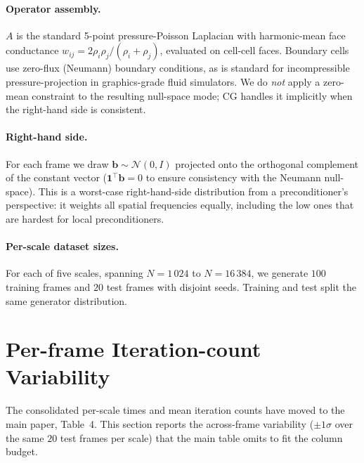 \documentclass[acmtog]{acmart}
\begin{document}
\paragraph{Operator assembly.}
$A$ is the standard 5-point pressure-Poisson Laplacian with harmonic-mean face
conductance $w_{ij}\!=\!2\rho_i\rho_j/(\rho_i\!+\!\rho_j)$, evaluated on
cell-cell faces. Boundary cells use zero-flux (Neumann) boundary conditions, as
is standard for incompressible pressure-projection in graphics-grade fluid
simulators. We do \emph{not} apply a zero-mean constraint to the resulting
null-space mode; CG handles it implicitly when the right-hand side is consistent.

\paragraph{Right-hand side.}
For each frame we draw $\mathbf{b}\!\sim\!\mathcal{N}(0, I)$ projected onto the
orthogonal complement of the constant vector ($\mathbf{1}^\top\mathbf{b}\!=\!0$
to ensure consistency with the Neumann null-space). This is a worst-case
right-hand-side distribution from a preconditioner's perspective: it weights all
spatial frequencies equally, including the low ones that are hardest for local
preconditioners.

\paragraph{Per-scale dataset sizes.}
For each of five scales, spanning $N=1\,024$ to $N=16\,384$, we generate
$100$ training frames and $20$ test frames with disjoint seeds.
Training and test split the same generator distribution.

\section{Per-frame Iteration-count Variability}
\label{supp:full_perf_table}

The consolidated per-scale times and mean iteration counts have moved to the
main paper, Table~4. This section reports the across-frame variability
($\pm 1\sigma$ over the same $20$ test frames per scale) that the main table
omits to fit the column budget.
\end{document}
